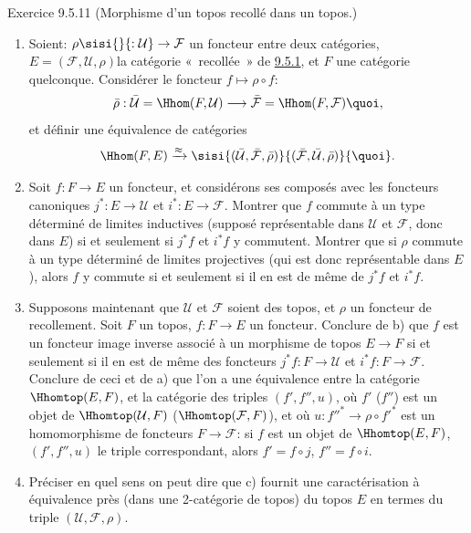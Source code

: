 \documentclass[10pt]{../fichiers-configuration-latex/smfart}
\begin{document}
\begin{enonce*}[remark]{Exercice 9.5.11}
(Morphisme d'un topos recollé dans un topos.)
\begin{enumerate}
\renewcommand{\theenumi}{\alph{enumi}}
\renewcommand{\labelenumi}{\theenumi)}
\item Soient: $\rho \sisi{}{: \mathcal{U}} \rightarrow \mathcal{F}$ un foncteur entre deux
catégories, $E=(\mathcal{F},\mathcal{U},\rho)$\pageoriginale la
catégorie « recollée »  de \hyperref[IV.subsubsec9.5.1]{9.5.1}, et $F$ une
catégorie quelconque. Considérer le foncteur $f\mapsto \rho\circ f$:
$$
\bar{\rho}:\bar{\mathcal{U}}=\Hhom(F,\mathcal{U})\longrightarrow
\bar{\mathcal{F}}=\Hhom(F,\mathcal{F}){\quoi},
$$
et définir une équivalence de catégories
$$
\Hhom(F,E)\xrightarrow{\approx}
\sisi{(\bar{\mathcal{U}},\bar{\mathcal{F}},\bar{\rho})}
{(\bar{\mathcal{F}},\bar{\mathcal{U}},\bar{\rho})}{\quoi}.
$$

\item Soit $f:F\rightarrow E$ un foncteur, et considérons ses composés
avec les foncteurs canoniques $j^{\ast}:E\rightarrow \mathcal{U}$ et
$i^{\ast}:E\rightarrow \mathcal{F}$. Montrer que $f$ commute à un
type déterminé de limites inductives (supposé représentable dans
$\mathcal{U}$ et $\mathcal{F}$, donc dans $E$) si et seulement si
$j^{\ast}f$ et $i^{\ast}f$ y commutent. Montrer que si $\rho$
commute à un type déterminé de limites projectives (qui est donc
représentable dans $E$), alors $f$ y commute si et seulement si il
en est de même de $j^{\ast}f$ et $i^{\ast}f$.

\item Supposons maintenant que $\mathcal{U}$ et $\mathcal{F}$ soient
  des topos, et
$\rho$ un foncteur de recollement. Soit $F$ un topos,
$f:F\rightarrow E$ un foncteur. Conclure de b) que $f$ est un
foncteur image inverse associé à un morphisme de topos $E\rightarrow
F$ si et seulement si il en est de même des foncteurs
$j^{\ast}f:F\rightarrow \mathcal{U}$ et $i^{\ast}f:F\rightarrow
\mathcal{F}$. Conclure de ceci et de a) que l'on a une équivalence
entre la catégorie $\Hhomtop(E,F)$, et la catégorie des triples
$(f',f'',u)$, où $f'$ (\resp $f''$) est un objet de
$\Hhomtop(\mathcal{U}, F)$ (\resp $\Hhomtop(\mathcal{F}, F)$), et où
$u:{f''}^{\ast}\rightarrow \rho\circ {f'}^{\ast}$ est un
homomorphisme de foncteurs $F\rightarrow \mathcal{F}$: si $f$ est un
objet de $\Hhomtop(E,F)$, $(f',f'',u)$ le triple correspondant,
alors $f'=f\circ j$, $f''=f\circ i$.

\item Préciser en quel sens on peut dire que c) fournit une
caractérisation à équivalence près (dans une 2-catégorie de topos)
du topos $E$ en termes du triple $(\mathcal{U},\mathcal{F},\rho)$.
\end{enumerate}
\end{enonce*}
\end{document}
